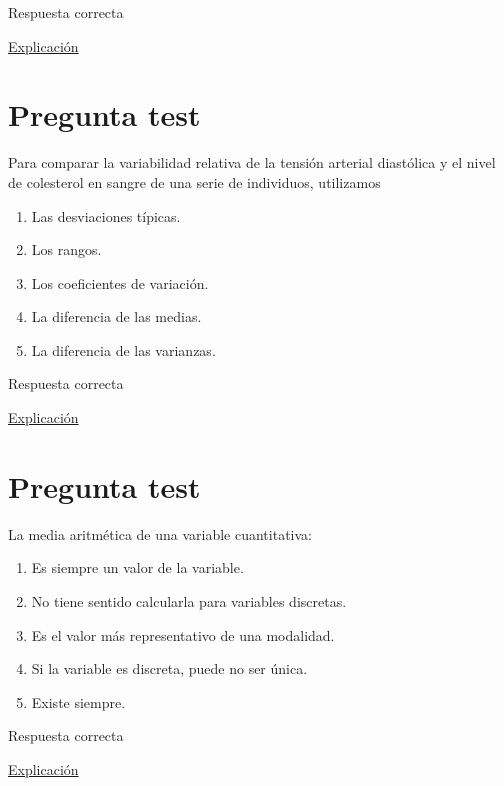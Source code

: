 \documentclass[
]{book}
\providecommand{\tightlist}{%
  \setlength{\itemsep}{0pt}\setlength{\parskip}{0pt}}
\begin{document}
Respuesta correcta

\href{https://1fjmanzano.github.io/bioestadistica/diagramas-de-barras-y-sectores.html}{Explicación}

\hypertarget{pregunta-test-61}{%
\section{Pregunta test}\label{pregunta-test-61}}

Para comparar la variabilidad relativa de la tensión arterial diastólica y el nivel de colesterol en sangre de una serie de individuos, utilizamos

\begin{enumerate}
\def\labelenumi{\alph{enumi})}
\tightlist
\item
  Las desviaciones típicas.
\item
  Los rangos.
\item
  Los coeficientes de variación.
\item
  La diferencia de las medias.
\item
  La diferencia de las varianzas.
\end{enumerate}

Respuesta correcta

\href{https://1fjmanzano.github.io/bioestadistica/medidas-de-posicio\%CC\%81n-dispersio\%CC\%81n-y-forma.html}{Explicación}

\hypertarget{pregunta-test-62}{%
\section{Pregunta test}\label{pregunta-test-62}}

La media aritmética de una variable cuantitativa:

\begin{enumerate}
\def\labelenumi{\alph{enumi})}
\tightlist
\item
  Es siempre un valor de la variable.
\item
  No tiene sentido calcularla para variables discretas.
\item
  Es el valor más representativo de una modalidad.
\item
  Si la variable es discreta, puede no ser única.
\item
  Existe siempre.
\end{enumerate}

Respuesta correcta

\href{https://1fjmanzano.github.io/bioestadistica/medidas-de-posicio\%CC\%81n-dispersio\%CC\%81n-y-forma.html\#medidas-de-posicio\%CC\%81n-centrales}{Explicación}
\end{document}
